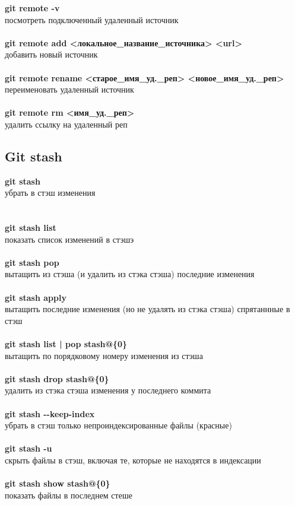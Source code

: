 \documentclass[a4paper, 12px]{article}
\begin{document}
\textbf{git remote -v}\\посмотреть подключенный удаленный источник\\\\
\textbf{git remote add <локальное\_название\_источника> <url>}\\добавить новый источник\\\\
\textbf{git remote rename <старое\_имя\_уд.\_реп> <новое\_имя\_уд.\_реп>}\\переименовать удаленный источник\\\\
\textbf{git remote rm <имя\_уд.\_реп>}\\удалить ссылку на удаленный реп

\subsection{Git stash}

\textbf{git stash}\\убрать в стэш изменения\\\\\\
\textbf{git stash list}\\показать список изменений в стэшэ\\\\
\textbf{git stash pop}\\вытащить из стэша (и удалить из стэка стэша) последние изменения\\\\
\textbf{git stash apply}\\вытащить последние изменения (но не удалять из стэка стэша) спрятаннные в стэш\\\\
\textbf{git stash list | pop stash@\{0\}}\\вытащить по порядковому номеру изменения из стэша\\\\
\textbf{git stash drop stash@\{0\}}\\удалить из стэка стэша изменения у последнего коммита\\\\
\textbf{git stash -\--keep-index}\\убрать в стэш только непроиндексированные файлы (красные)\\\\
\textbf{git stash -u}\\скрыть файлы в стэш, включая те, которые не находятся в индексации\\\\
\textbf{git stash show stash@\{0\}}\\
показать файлы в последнем стеше
\end{document}
